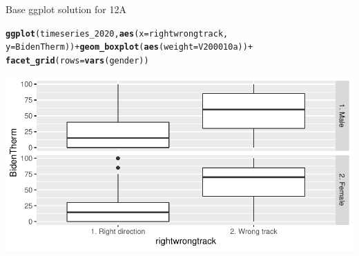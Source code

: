 \documentclass{beamer}\usepackage[]{graphicx}\usepackage[]{color}
\makeatletter
\newcommand{\hlopt}[1]{\textcolor[rgb]{0,0,0}{#1}}%
\newcommand{\hlstd}[1]{\textcolor[rgb]{0.345,0.345,0.345}{#1}}%
\newcommand{\hlkwc}[1]{\textcolor[rgb]{0.333,0.667,0.333}{#1}}%
\newcommand{\hlkwd}[1]{\textcolor[rgb]{0.737,0.353,0.396}{\textbf{#1}}}%
\newenvironment{kframe}{%
 \def\at@end@of@kframe{}%
 \ifinner\ifhmode%
  \def\at@end@of@kframe{\end{minipage}}%
  \begin{minipage}{\columnwidth}%
 \fi\fi%
 \def\FrameCommand##1{\hskip\@totalleftmargin \hskip-\fboxsep
 \colorbox{shadecolor}{##1}\hskip-\fboxsep
     \hskip-\linewidth \hskip-\@totalleftmargin \hskip\columnwidth}%
 \MakeFramed {\advance\hsize-\width
   \@totalleftmargin\z@ \linewidth\hsize
   \@setminipage}}%
 {\par\unskip\endMakeFramed%
 \at@end@of@kframe}
\newenvironment{knitrout}{}{} %
\makeatother
\begin{document}
\begin{frame}[fragile]{Base ggplot solution for 12A}
\begin{knitrout}
\color{fgcolor}\begin{kframe}
\begin{alltt}
\hlkwd{ggplot}\hlstd{(timeseries_2020,} \hlkwd{aes}\hlstd{(}\hlkwc{x} \hlstd{= rightwrongtrack,}
    \hlkwc{y} \hlstd{= BidenTherm))} \hlopt{+} \hlkwd{geom_boxplot}\hlstd{(}\hlkwd{aes}\hlstd{(}\hlkwc{weight} \hlstd{= V200010a))} \hlopt{+}
    \hlkwd{facet_grid}\hlstd{(}\hlkwc{rows} \hlstd{=} \hlkwd{vars}\hlstd{(gender))}
\end{alltt}
\end{kframe}
\includegraphics[width=0.95\linewidth]{figure/unnamed-chunk-51-1} 
\end{knitrout}

\end{frame}
\end{document}
